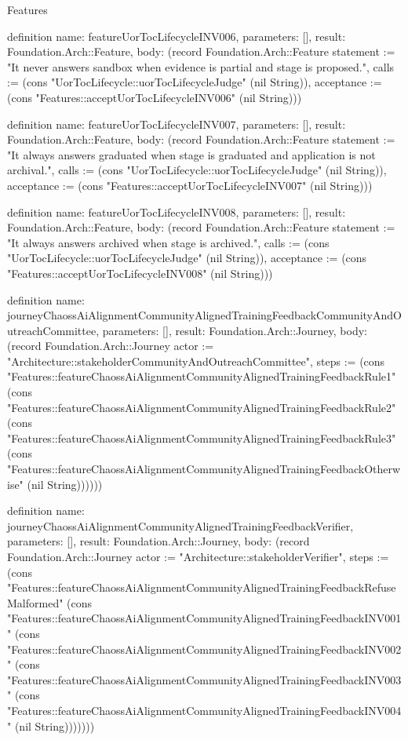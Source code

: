 \begin{lexlean}{Features}
\begin{semanticmodule}
definition{
  name: featureUorTocLifecycleINV006,
  parameters: [],
  result: Foundation.Arch::Feature,
  body: (record Foundation.Arch::Feature {statement := "It never answers sandbox when evidence is partial and stage is proposed.", calls := (cons "UorTocLifecycle::uorTocLifecycleJudge" (nil String)), acceptance := (cons "Features::acceptUorTocLifecycleINV006" (nil String))})
}

definition{
  name: featureUorTocLifecycleINV007,
  parameters: [],
  result: Foundation.Arch::Feature,
  body: (record Foundation.Arch::Feature {statement := "It always answers graduated when stage is graduated and application is not archival.", calls := (cons "UorTocLifecycle::uorTocLifecycleJudge" (nil String)), acceptance := (cons "Features::acceptUorTocLifecycleINV007" (nil String))})
}

definition{
  name: featureUorTocLifecycleINV008,
  parameters: [],
  result: Foundation.Arch::Feature,
  body: (record Foundation.Arch::Feature {statement := "It always answers archived when stage is archived.", calls := (cons "UorTocLifecycle::uorTocLifecycleJudge" (nil String)), acceptance := (cons "Features::acceptUorTocLifecycleINV008" (nil String))})
}

definition{
  name: journeyChaossAiAlignmentCommunityAlignedTrainingFeedbackCommunityAndOutreachCommittee,
  parameters: [],
  result: Foundation.Arch::Journey,
  body: (record Foundation.Arch::Journey {actor := "Architecture::stakeholderCommunityAndOutreachCommittee", steps := (cons "Features::featureChaossAiAlignmentCommunityAlignedTrainingFeedbackRule1" (cons "Features::featureChaossAiAlignmentCommunityAlignedTrainingFeedbackRule2" (cons "Features::featureChaossAiAlignmentCommunityAlignedTrainingFeedbackRule3" (cons "Features::featureChaossAiAlignmentCommunityAlignedTrainingFeedbackOtherwise" (nil String)))))})
}

definition{
  name: journeyChaossAiAlignmentCommunityAlignedTrainingFeedbackVerifier,
  parameters: [],
  result: Foundation.Arch::Journey,
  body: (record Foundation.Arch::Journey {actor := "Architecture::stakeholderVerifier", steps := (cons "Features::featureChaossAiAlignmentCommunityAlignedTrainingFeedbackRefuseMalformed" (cons "Features::featureChaossAiAlignmentCommunityAlignedTrainingFeedbackINV001" (cons "Features::featureChaossAiAlignmentCommunityAlignedTrainingFeedbackINV002" (cons "Features::featureChaossAiAlignmentCommunityAlignedTrainingFeedbackINV003" (cons "Features::featureChaossAiAlignmentCommunityAlignedTrainingFeedbackINV004" (nil String))))))})
}


\end{semanticmodule}
\end{lexlean}
